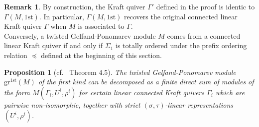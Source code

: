 \documentclass[12pt]{amsart}
\newtheorem{proposition}[theorem]{Proposition}
\theoremstyle{definition}
\newtheorem{remark}[theorem]{Remark}
\newcommand{\<}{\langle}   %
\renewcommand{\>}{\rangle} %
\begin{document}
\begin{remark}
    By construction, the Kraft quiver $\Gamma'$ defined in the proof is identic to $\Gamma(M,1\mathrm{st})$. In particular, $\Gamma(M,1\mathrm{st})$ recovers the original connected linear Kraft quiver $\Gamma$ when $M$ is associated to $\Gamma$.\\
    Conversely, a twisted Gelfand-Ponomarev module $M$ comes from a connected linear Kraft quiver if and only if $\Sigma_1$ is totally ordered under the prefix ordering relation $\preceq$ defined at the beginning of this section.
\end{remark}

\begin{proposition}[cf.~\cite{gelfand-ponomarev:1968} Theorem 4.5]\label{DecompositionSumLinearKraftQuiver}
    The twisted Gelfand-Ponomarev module $\mathrm{gr}^{1\mathrm{st}}(M)$ of the first kind can be decomposed as a finite direct sum of modules of the form $M(\Gamma_i,U^i,\rho^i)$ for certain linear connected Kraft quivers $\Gamma_i$ which are pairwise non-isomorphic, together with strict $(\sigma,\tau)$-linear representations $(U^i,\rho^i)$. 
\end{proposition}
\end{document}
